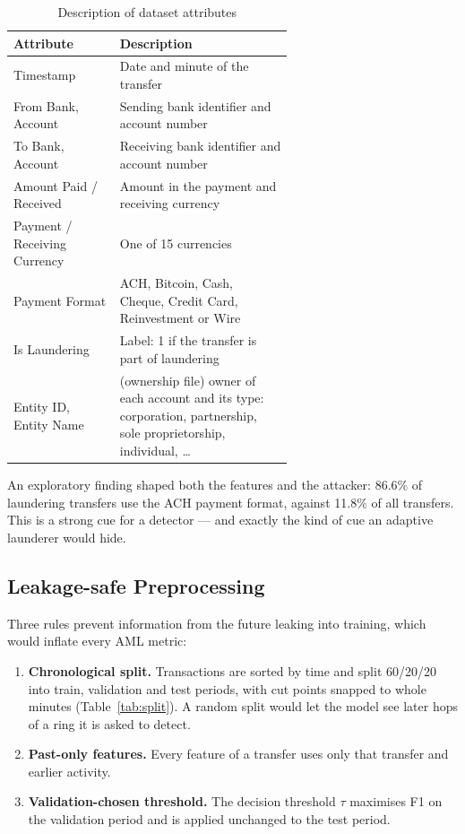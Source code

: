 \begin{table}[H]
\centering
\renewcommand{\arraystretch}{1.2}
\begin{tabular}{|l|>{\raggedright\arraybackslash}p{0.62\linewidth}|} \hline
\textbf{Attribute} & \textbf{Description} \\ \hline
Timestamp & Date and minute of the transfer \\ \hline
From Bank, Account & Sending bank identifier and account number \\ \hline
To Bank, Account & Receiving bank identifier and account number \\ \hline
Amount Paid / Received & Amount in the payment and receiving currency \\ \hline
Payment / Receiving Currency & One of 15 currencies \\ \hline
Payment Format & ACH, Bitcoin, Cash, Cheque, Credit Card, Reinvestment or Wire \\ \hline
Is Laundering & Label: 1 if the transfer is part of laundering \\ \hline
Entity ID, Entity Name & (ownership file) owner of each account and its type: corporation, partnership, sole proprietorship, individual, \ldots \\ \hline
\end{tabular}
\caption{Description of dataset attributes}
\label{tab:attributes}
\end{table}

An exploratory finding shaped both the features and the attacker: 86.6\% of laundering transfers use the ACH payment format, against 11.8\% of all transfers. This is a strong cue for a detector --- and exactly the kind of cue an adaptive launderer would hide.

\subsection{Leakage-safe Preprocessing}
Three rules prevent information from the future leaking into training, which would inflate every AML metric:
\begin{enumerate}
    \item \textbf{Chronological split.} Transactions are sorted by time and split 60/20/20 into train, validation and test periods, with cut points snapped to whole minutes (Table~\ref{tab:split}). A random split would let the model see later hops of a ring it is asked to detect.
    \item \textbf{Past-only features.} Every feature of a transfer uses only that transfer and earlier activity.
    \item \textbf{Validation-chosen threshold.} The decision threshold $\tau$ maximises F1 on the validation period and is applied unchanged to the test period.
\end{enumerate}

